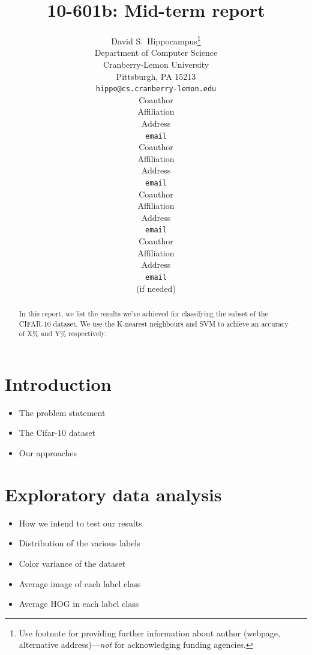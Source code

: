 \documentclass{article} %
\title{10-601b: Mid-term report}
\author{
David S.~Hippocampus\thanks{ Use footnote for providing further information
about author (webpage, alternative address)---\emph{not} for acknowledging
funding agencies.} \\
Department of Computer Science\\
Cranberry-Lemon University\\
Pittsburgh, PA 15213 \\
\texttt{hippo@cs.cranberry-lemon.edu} \\
\And
Coauthor \\
Affiliation \\
Address \\
\texttt{email} \\
\AND
Coauthor \\
Affiliation \\
Address \\
\texttt{email} \\
\And
Coauthor \\
Affiliation \\
Address \\
\texttt{email} \\
\And
Coauthor \\
Affiliation \\
Address \\
\texttt{email} \\
(if needed)\\
}
\begin{document}
\maketitle

\begin{abstract}
    In this report, we list the results we've achieved for classifying the subset of the CIFAR-10 dataset. We use the K-nearest neighbours and SVM to achieve an accuracy of X\% and Y\% respectively.\\
\end{abstract}

\section{Introduction}
    \begin{itemize}
        \item The problem statement
        \item The Cifar-10 dataset
        \item Our approaches
    \end{itemize}

\section{Exploratory data analysis}
    \begin{itemize}
        \item How we intend to test our results
        \item Distribution of the various labels
        \item Color variance of the dataset
        \item Average image of each label class
        \item Average HOG in each label class
    \end{itemize}
\end{document}
